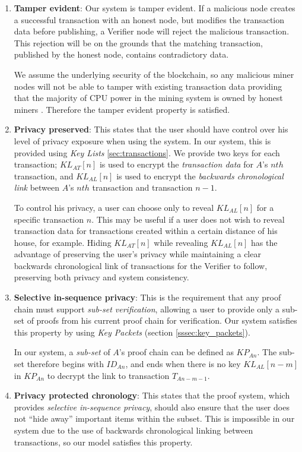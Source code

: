 \documentclass[12pt]{article}
\begin{document}
\begin{enumerate}
\item[] \textbf{Tamper evident}: Our system is tamper evident. If a malicious node creates a successful transaction with an honest node, but modifies the transaction data before publishing, a Verifier node will reject the malicious transaction. This rejection will be on the grounds that the matching transaction, published by the honest node, contains contradictory data.

We assume the underlying security of the blockchain, so any malicious miner nodes will not be able to tamper with existing transaction data providing that the majority of CPU power in the mining system is owned by honest miners \cite{bitcoin}. Therefore the tamper evident property is satisfied.

\item[] \textbf{Privacy preserved}: This states that the user should have control over his level of privacy exposure when using the system. In our system, this is provided using \textit{Key Lists} \ref{sec:transactions}. We provide two keys for each transaction; $KL_{AT}[n]$ is used to encrypt the \textit{transaction data} for $A$'s $nth$ transaction, and $KL_{AL}[n]$ is used to encrypt the \textit{backwards chronological link} between $A$'s $nth$ transaction and transaction $n-1$.

To control his privacy, a user can choose only to reveal $KL_{AL}[n]$ for a specific transaction $n$. This may be useful if a user does not wish to reveal transaction data for transactions created within a certain distance of his house, for example. Hiding $KL_{AT}[n]$ while revealing $KL_{AL}[n]$ has the advantage of preserving the user's privacy while maintaining a clear backwards chronological link of transactions for the Verifier to follow, preserving both privacy and system consistency.

\item[] \textbf{Selective in-sequence privacy}: This is the requirement that any proof chain must support \textit{sub-set verification}, allowing a user to provide only a sub-set of proofs from his current proof chain for verification. Our system satisfies this property by using \textit{Key Packets} (section \ref{sssec:key_packets}).

In our system, a \textit{sub-set} of $A$'s proof chain can be defined as $KP_{An}$. The sub-set therefore begins with $ID_{An}$, and ends when there is no key $KL_{AL}[n-m]$ in $KP_{An}$ to decrypt the link to transaction $T_{An-m-1}$. 

\item[] \textbf{Privacy protected chronology}: This states that the proof system, which provides \textit{selective in-sequence privacy}, should also ensure that the user does not ``hide away'' important items within the subset. This is impossible in our system due to the use of backwards chronological linking between transactions, so our model satisfies this property.


\end{enumerate}
\end{document}
